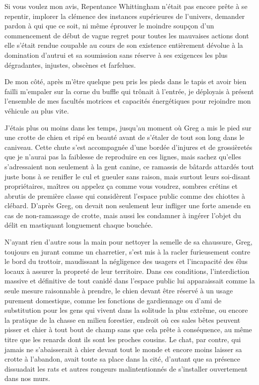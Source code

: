 Si vous voulez mon avis, Repentance Whittingham n’était pas encore prête à se repentir, implorer la clémence des instances supérieures de l’univers, demander pardon à qui que ce soit, ni même éprouver le moindre soupçon d’un commencement de début de vague regret pour toutes les mauvaises actions dont elle s’était rendue coupable au cours de son existence entièrement dévolue à la domination d’autrui et sa soumission sans réserve à ses exigences les plus dégradantes, injustes, obscènes et farfelues.

De mon côté, après m’être quelque peu pris les pieds dans le tapis et avoir bien failli m’empaler sur la corne du buffle qui trônait à l’entrée, je déployais à présent l’ensemble de mes facultés motrices et capacités énergétiques pour rejoindre mon véhicule au plus vite.

J’étais plus ou moins dans les temps, jusqu’au moment où Greg a mis le pied sur une crotte de chien et ripé en beauté avant de s’étaler de tout son long dans le caniveau. Cette chute s’est accompagnée d’une bordée d’injures et de grossièretés que je n’aurai pas la faiblesse de reproduire en ces lignes, mais sachez qu’elles s’adressaient non seulement à la gent canine, ce ramassis de bâtards attardés tout juste bons à se renifler le cul et gueuler sans raison, mais surtout leurs soi-disant propriétaires, maîtres ou appelez ça comme vous voudrez, sombres crétins et abrutis de première classe qui considèrent l’espace public comme des chiottes à clébard. D’après Greg, on devait non seulement leur infliger une forte amende en cas de non-ramassage de crotte, mais aussi les condamner à ingérer l’objet du délit en mastiquant longuement chaque bouchée.

N’ayant rien d’autre sous la main pour nettoyer la semelle de sa chaussure, Greg, toujours en jurant comme un charretier, s’est mis à la racler furieusement contre le bord du trottoir, maudissant la négligence des usagers et l’incapacité des élus locaux à assurer la propreté de leur territoire. Dans ces conditions, l’interdiction massive et définitive de tout canidé dans l’espace public lui apparaissait comme la seule mesure raisonnable à prendre, le chien devant être réservé à un usage purement domestique, comme les fonctions de gardiennage ou d’ami de substitution pour les gens qui vivent dans la solitude la plus extrême, ou encore la pratique de la chasse en milieu forestier, endroit où ces sales bêtes peuvent pisser et chier à tout bout de champ sans que cela prête à conséquence, au même titre que les renards dont ils sont les proches cousins. Le chat, par contre, qui jamais ne s’abaisserait à chier devant tout le monde et encore moins laisser sa crotte à l’abandon, avait toute sa place dans la cité, d’autant que sa présence dissuadait les rats et autres rongeurs malintentionnés de s’installer ouvertement dans nos murs.

